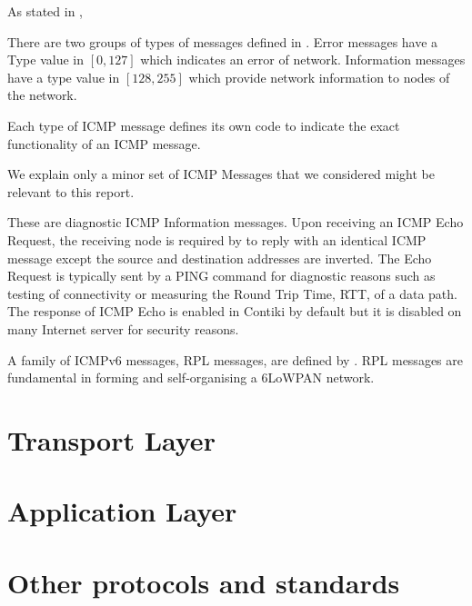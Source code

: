 As stated in \cite{rfc4443},
\begin{description}[style=nextline]
\item[\textbf{Type}]
There are two groups of types of messages defined in \cite{rfc4443}. Error messages have a Type value in $[0,127]$ which indicates an error of network. Information messages have a type value in $[128,255]$ which provide network information to nodes of the network.
\item[\textbf{Code}]
Each type of ICMP message defines its own code to indicate the exact functionality of an ICMP message.
\item[\textbf{Checksum}]
\end{description}

We explain only a minor set of ICMP Messages that we considered might be relevant to this report.
\begin{description}[style=nextline]
\item[\textbf{Echo Request and Reply Messages}]
These are diagnostic ICMP Information messages. Upon receiving an ICMP Echo Request, the receiving node is required by \cite{rfc4443} to reply with an identical ICMP message except the source and destination addresses are inverted. The Echo Request is typically sent by a PING command for diagnostic reasons such as testing of connectivity or measuring the Round Trip Time, RTT, of a data path. The response of ICMP Echo is enabled in Contiki by default but it is disabled on many Internet server for security reasons.
\end{description}

A family of ICMPv6 messages, RPL messages, are defined by \cite{rfc6550}. RPL messages are fundamental in forming and self-organising a 6LoWPAN network. 

\section{Transport Layer} \label{Sec: Transportation Layer}

\section{Application Layer}

\section{Other protocols and standards}
